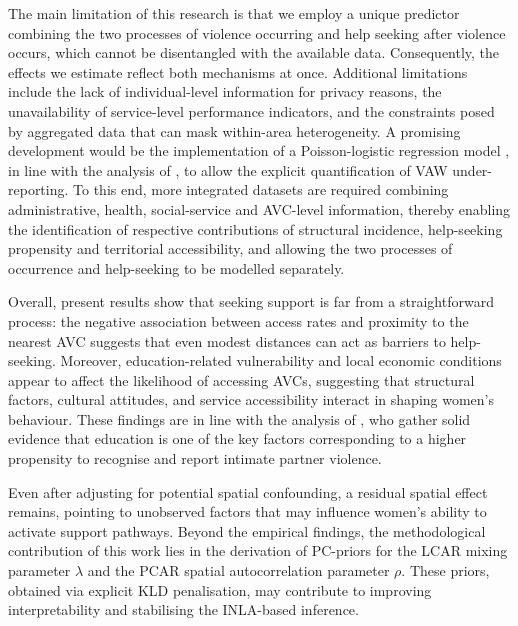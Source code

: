 \documentclass[openany, 11pt, oneside]{book}
\begin{document}
The main limitation of this research is that we employ a unique predictor combining the two processes of violence occurring and help seeking after violence occurs, which cannot be disentangled with the available data. Consequently, the effects we estimate reflect both mechanisms at once. Additional limitations include the lack of individual-level information for privacy reasons, the unavailability of service-level performance indicators, and the constraints posed by aggregated data that can mask within-area heterogeneity. 
A promising development would be the implementation of a Poisson-logistic regression model \parencite{Stoner02102019}, in line with the analysis of \cite{Polettini}, to allow the explicit quantification of VAW under-reporting. To this end, more integrated datasets are required combining administrative, health, social-service and AVC-level information, thereby enabling the identification of respective contributions of structural incidence, help-seeking propensity and territorial accessibility, and allowing the two processes of occurrence and help-seeking to be modelled separately. 
 
Overall, present results show that seeking support is far from a straightforward process: the negative association between access rates and proximity to the nearest AVC suggests that even modest distances can act as barriers to help-seeking. Moreover, education-related vulnerability and local economic conditions appear to affect the likelihood of accessing AVCs, suggesting that structural factors, cultural attitudes, and service accessibility interact in shaping women’s behaviour. These findings are in line with the analysis of \cite{Gracia2020}, who gather solid evidence that education is one of the key factors corresponding to a higher propensity to recognise and report intimate partner violence.

Even after adjusting for potential spatial confounding, a residual spatial effect remains, pointing to unobserved factors that may influence women’s ability to activate support pathways. Beyond the empirical findings, the methodological contribution of this work lies in the derivation of PC-priors for the LCAR mixing parameter $\lambda$ and the PCAR spatial autocorrelation parameter $\rho$. These priors, obtained via explicit KLD penalisation, may contribute to improving interpretability and stabilising the INLA-based inference.
\end{document}
